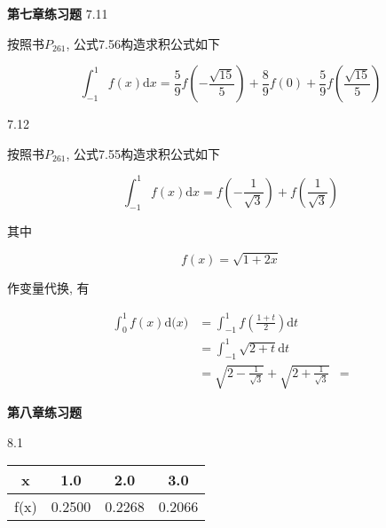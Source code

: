 \documentclass[a4paper, 10pt]{article}
\newcommand{\ud}[1]{\mathrm{d} {#1}}
\begin{document}
\begin{CJK}{UTF8}{gbsn}

\textbf{第七章练习题}
7.11

按照书$P_{261}$, 公式7.56构造求积公式如下

\begin{equation}
	\int_{-1}^{1}f(x)\ud{x} = \frac{5}{9}f(-\frac{\sqrt{15}}{5})+\frac{8}{9}f(0)+\frac{5}{9}f(\frac{\sqrt{15}}{5})
\end{equation}



7.12

按照书$P_{261}$, 公式7.55构造求积公式如下

\begin{equation}
	\int_{-1}^{1}f(x)\ud{x} = f(-\frac{1}{\sqrt{3}})+f(\frac{1}{\sqrt{3}})
\end{equation}




其中

\begin{equation*}
	f(x) = \sqrt{1+2x}
\end{equation*}

作变量代换, 有

\begin{align*}
	\int_{0}^{1}f(x)\ud(x) & = \int_{-1}^{1}f(\frac{1+t}{2})\ud{t} \\
						   & = \int_{-1}^{1}\sqrt{2+t}\ud{t} \\
						   & = \sqrt{2-\frac{1}{\sqrt{3}}} + \sqrt{2+\frac{1}{\sqrt{3}}}
						   & = 
\end{align*}



\textbf{第八章练习题}

8.1\\
\begin{tabular}{|c | c c c|}
\hline
x    & 1.0    & 2.0    & 3.0 \\
\hline
f(x) & 0.2500 & 0.2268 & 0.2066 \\
\hline
\end{tabular}


\end{CJK}
\end{document}
